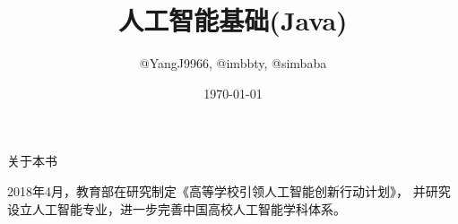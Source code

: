 \documentclass[oneside, UTF8]{ctexbook}
\begin{document}
\frontmatter
\title{\Huge\textbf{人工智能基础(Java)}}
\author{@YangJ9966, @imbbty, @simbaba}
\date{\today}

\maketitle

\centerline {\large {关于本书}}
\quad \par
2018年4月，教育部在研究制定《高等学校引领人工智能创新行动计划》，
并研究设立人工智能专业，进一步完善中国高校人工智能学科体系。

\tableofcontents





\mainmatter

\backmatter
{}

\appendix

\small{


\clearpage
}

\printglossary[title=术语]
\end{document}
